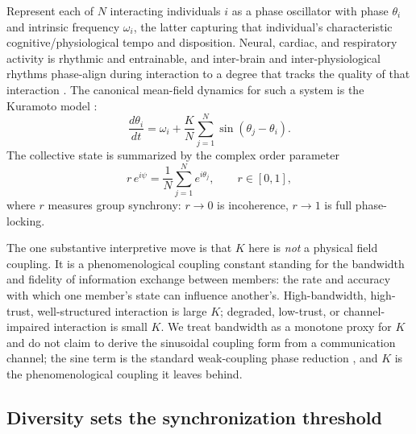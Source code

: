 \documentclass[11pt]{article}
\begin{document}
Represent each of $N$ interacting individuals $i$ as a phase oscillator with phase $\theta_i$ and intrinsic frequency $\omega_i$, the latter capturing that individual's characteristic cognitive/physiological tempo and disposition. Neural, cardiac, and respiratory activity is rhythmic and entrainable, and inter-brain and inter-physiological rhythms phase-align during interaction to a degree that tracks the quality of that interaction \citep{stephens2010speaker, dikker2017brain}. The canonical mean-field dynamics for such a system is the Kuramoto model \citep{kuramoto1984chemical, strogatz2000kuramoto}:
\begin{equation}
\frac{d\theta_i}{dt} = \omega_i + \frac{K}{N}\sum_{j=1}^{N}\sin(\theta_j - \theta_i).
\label{eq:kuramoto}
\end{equation}
The collective state is summarized by the complex order parameter
\begin{equation}
r\,e^{i\psi} = \frac{1}{N}\sum_{j=1}^{N} e^{i\theta_j}, \qquad r \in [0,1],
\label{eq:order}
\end{equation}
where $r$ measures group synchrony: $r \to 0$ is incoherence, $r \to 1$ is full phase-locking.

The one substantive interpretive move is that $K$ here is \emph{not} a physical field coupling. It is a phenomenological coupling constant standing for the bandwidth and fidelity of information exchange between members: the rate and accuracy with which one member's state can influence another's. High-bandwidth, high-trust, well-structured interaction is large $K$; degraded, low-trust, or channel-impaired interaction is small $K$. We treat bandwidth as a monotone proxy for $K$ and do not claim to derive the sinusoidal coupling form from a communication channel; the sine term is the standard weak-coupling phase reduction \citep{pikovsky2001synchronization}, and $K$ is the phenomenological coupling it leaves behind.

\subsection{Diversity sets the synchronization threshold}
\end{document}

